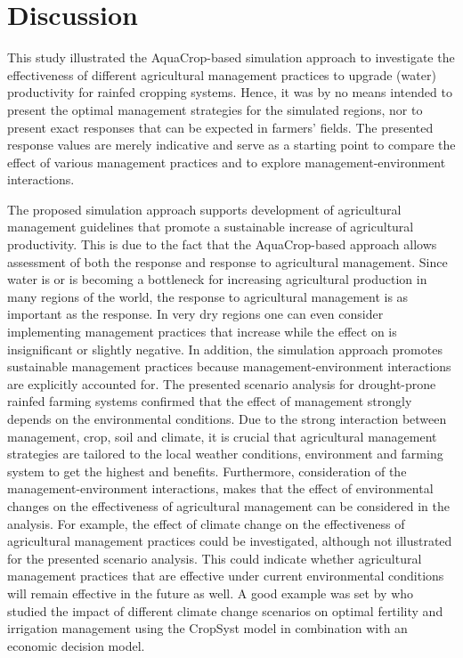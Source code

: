 \section{Discussion} 
This study illustrated the AquaCrop-based simulation approach to investigate the effectiveness of different agricultural management practices to upgrade (water) productivity for rainfed cropping systems. Hence, it was by no means intended to present the optimal management strategies for the simulated regions, nor to present exact responses that can be expected in farmers' fields. The presented response values are merely indicative and serve as a starting point to compare the effect of various management practices and to explore management-environment interactions.

The proposed simulation approach supports development of agricultural management guidelines that promote a sustainable increase of agricultural productivity. This is due to the fact that the AquaCrop-based approach allows assessment of both the \Y response and \WPET response to agricultural management. Since water is or is becoming a bottleneck for increasing agricultural production in many regions of the world, the \WPET response to agricultural management is as important as the \Y response. In very dry regions one can even consider implementing management practices that increase \WPET while the effect on \Y is insignificant or slightly negative. In addition, the simulation approach promotes sustainable management practices because management-environment interactions are explicitly accounted for. The presented scenario analysis for drought-prone rainfed farming systems confirmed that the effect of management strongly depends on the environmental conditions. Due to the strong interaction between management, crop, soil and climate, it is crucial that agricultural management strategies are tailored to the local weather conditions, environment and farming system to get the highest \Y and \WPET benefits. Furthermore, consideration of the management-environment interactions, makes that the effect of environmental changes on the effectiveness of agricultural management can be considered in the analysis. For example, the effect of climate change on the effectiveness of agricultural management practices could be investigated, although not illustrated for the presented scenario analysis. This could indicate whether agricultural management practices that are effective under current environmental conditions will remain effective in the future as well. A good example was set by \textcite{lehmann2013} who studied the impact of different climate change scenarios on optimal fertility and irrigation management using the CropSyst model in combination with an economic decision model.

